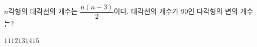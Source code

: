 $n$각형의 대각선의 개수는 $\dfrac{n(n-3)}{2}$이다. 대각선의 개수가 $90$인 다각형의 변의 개수는?
\begin{choices32}{$11$}{$12$}{$13$}{$14$}{$15$}\end{choices32}
